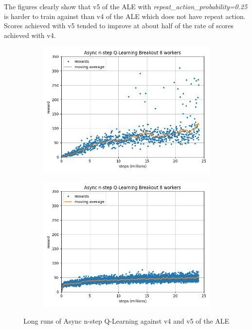 \documentclass{article}
\begin{document}
The figures clearly show that v5 of the ALE with \emph{repeat\_action\_probability=0.25} is harder to train against than v4 of the ALE which does not have repeat action. Scores achieved with v5 tended to improve at about half of the rate of scores achieved with v4.

\begin{figure}[H]
\centering
\begin{subfigure}{0.49\textwidth}
\centering
\includegraphics[scale=0.4]{"n_step v4 by steps"}
\end{subfigure}
\begin{subfigure}{0.49\textwidth}
\centering
\includegraphics[scale=0.4]{"n_step v5 by steps"}
\end{subfigure}
\caption{Long runs of Async n-step Q-Learning against v4 and v5 of the ALE}
\label{fig:ASYNC1}
\end{figure}
\end{document}
